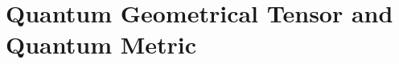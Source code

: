 \documentclass[11pt]{article}
\begin{document}
\newpage
\section{Quantum Geometrical Tensor and Quantum Metric}








\newpage
\vskip 0.5cm
\end{document}
